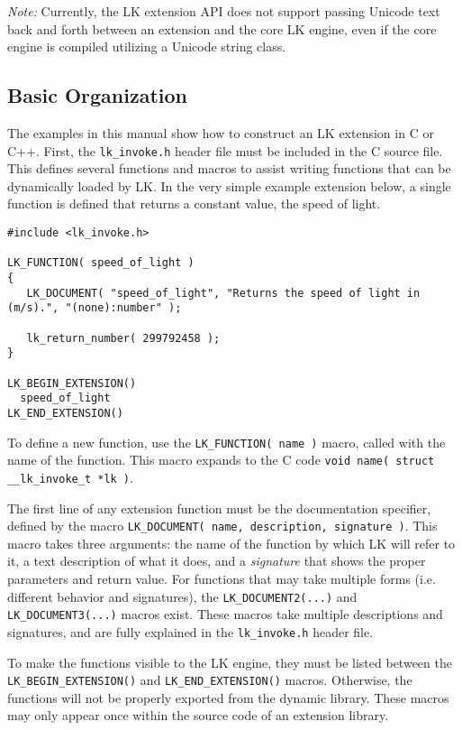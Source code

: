 \documentclass{article}
\begin{document}
\emph{Note:} Currently, the LK extension API does not support passing Unicode text back and forth between an extension and the core LK engine, even if the core engine is compiled utilizing a Unicode string class.

\subsection{Basic Organization}

The examples in this manual show how to construct an LK extension in C or C++.  First, the \texttt{lk\_invoke.h} header file must be included in the C source file.  This defines several functions and macros to assist writing functions that can be dynamically loaded by LK.  In the very simple example extension below, a single function is defined that returns a constant value, the speed of light.  

\begin{verbatim}
#include <lk_invoke.h>

LK_FUNCTION( speed_of_light )
{
   LK_DOCUMENT( "speed_of_light", "Returns the speed of light in (m/s).", "(none):number" );

   lk_return_number( 299792458 );
}

LK_BEGIN_EXTENSION()
  speed_of_light
LK_END_EXTENSION()
\end{verbatim}

To define a new function, use the \texttt{LK\_FUNCTION( name )} macro, called with the name of the function.  This macro expands to the C code \texttt{void name( struct \_\_lk\_invoke\_t *lk )}.

The first line of any extension function must be the documentation specifier, defined by the macro \texttt{LK\_DOCUMENT( name, description, signature )}.  This macro takes three arguments: the name of the function by which LK will refer to it, a text description of what it does, and a \emph{signature} that shows the proper parameters and return value.  For functions that may take multiple forms (i.e. different behavior and signatures), the \texttt{LK\_DOCUMENT2(...)} and \texttt{LK\_DOCUMENT3(...)} macros exist.  These macros take multiple descriptions and signatures, and are fully explained in the \texttt{lk\_invoke.h} header file.

To make the functions visible to the LK engine, they must be listed between the \texttt{LK\_BEGIN\_EXTENSION()} and \texttt{LK\_END\_EXTENSION()} macros.  Otherwise, the functions will not be properly exported from the dynamic library.  These macros may only appear once within the source code of an extension library.
\end{document}
